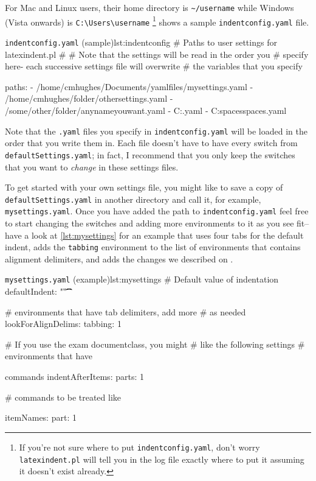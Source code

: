 \documentclass[11pt]{article}
\begin{document}
For Mac and Linux users, their home directory is \lstinline!~/username! while
Windows (Vista onwards) is \lstinline!C:\Users\username! \footnote{If you're not sure
	where to put \lstinline!indentconfig.yaml!, don't
	worry \lstinline!latexindent.pl! will tell you in the log file exactly where to
put it assuming it doesn't exist already.}
 shows a sample \lstinline!indentconfig.yaml! file.

\begin{cmhlistings}[style=yaml]{\lstinline!indentconfig.yaml! (sample)}{lst:indentconfig}
# Paths to user settings for latexindent.pl
#
# Note that the settings will be read in the order you
# specify here- each successive settings file will overwrite
# the variables that you specify

paths:
- /home/cmhughes/Documents/yamlfiles/mysettings.yaml
- /home/cmhughes/folder/othersettings.yaml
- /some/other/folder/anynameyouwant.yaml
- C:\Users\chughes\Documents\mysettings.yaml
- C:\Users\chughes\Desktop\test spaces\more spaces.yaml
\end{cmhlistings}

Note that the \lstinline!.yaml! files you specify in \lstinline!indentconfig.yaml!
will be loaded in the order that you write them in. Each file doesn't have
to have every switch from \lstinline!defaultSettings.yaml!; in fact, I recommend
that you only keep the switches that you want to \emph{change} in these
settings files.

To get started with your own settings file, you might like to save a copy of
\lstinline!defaultSettings.yaml! in another directory and call it, for
example, \lstinline!mysettings.yaml!. Once you have added the path to \lstinline!indentconfig.yaml!
feel free to start changing the switches and adding more environments to it
as you see fit--have a look at \cref{lst:mysettings} for an example
that uses four tabs for the default indent, adds the \lstinline!tabbing!
environment to the list of environments that contains alignment delimiters,
and adds the changes we described on .

\begin{cmhlistings}[style=yaml]{\lstinline!mysettings.yaml! (example)}{lst:mysettings}
# Default value of indentation
defaultIndent: "\t\t\t\t"

# environments that have tab delimiters, add more
# as needed
lookForAlignDelims:
   tabbing: 1

# If you use the exam documentclass, you might 
# like the following settings
# environments that have \item commands
indentAfterItems:
    parts: 1

# commands to be treated like \item
itemNames:
    part: 1
\end{cmhlistings}
\end{document}
